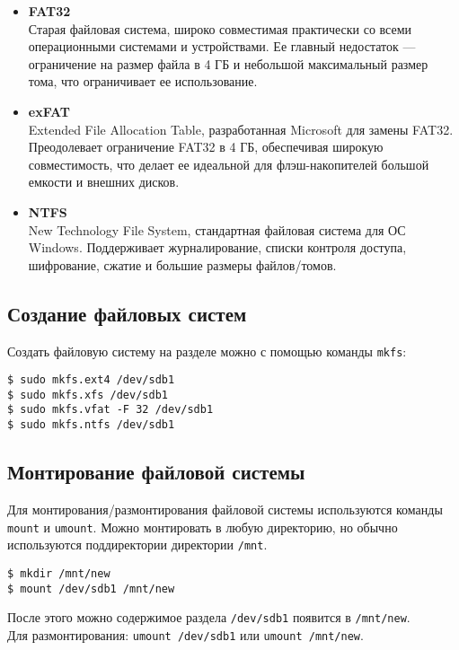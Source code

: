 \documentclass[10pt]{article}
\begin{document}
\begin{itemize}
\item \textbf{FAT32}\\
Старая файловая система, широко совместимая практически со всеми операционными системами и устройствами. Ее главный недостаток — ограничение на размер файла в 4 ГБ и небольшой максимальный размер тома, что ограничивает ее использование.

\item \textbf{exFAT}\\
Extended File Allocation Table, разработанная Microsoft для замены FAT32. Преодолевает ограничение FAT32 в 4 ГБ, обеспечивая широкую совместимость, что делает ее идеальной для флэш-накопителей большой емкости и внешних дисков.

\item \textbf{NTFS}\\
New Technology File System, стандартная файловая система для ОС Windows. Поддерживает журналирование, списки контроля доступа, шифрование, сжатие и большие размеры файлов/томов.
\end{itemize}

\subsection*{Создание файловых систем}
Создать файловую систему на разделе можно с помощью команды \texttt{mkfs}:
\begin{lstlisting}
$ sudo mkfs.ext4 /dev/sdb1
$ sudo mkfs.xfs /dev/sdb1 
$ sudo mkfs.vfat -F 32 /dev/sdb1
$ sudo mkfs.ntfs /dev/sdb1
\end{lstlisting}

\subsection*{Монтирование файловой системы}
Для монтирования/размонтирования файловой системы используются команды \texttt{mount} и \texttt{umount}. Можно монтировать в любую директорию, но обычно используются поддиректории директории \texttt{/mnt}.
\begin{lstlisting}
$ mkdir /mnt/new
$ mount /dev/sdb1 /mnt/new 
\end{lstlisting}
После этого можно содержимое раздела \texttt{/dev/sdb1} появится в \texttt{/mnt/new}. \\
Для размонтирования: \texttt{umount /dev/sdb1} или \texttt{umount /mnt/new}.
\end{document}
